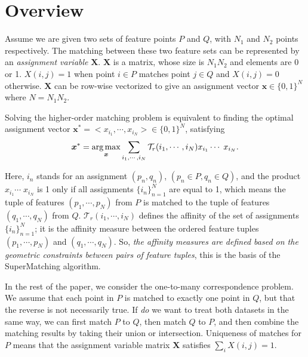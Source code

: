 \section{Overview}
\label{sec:overview}

Assume we are given two sets of feature points $P$ and $Q$, with $N_1$  and $N_2$ points respectively.
The matching between these two feature sets can be represented by an \emph{assignment variable} $\mathbf{X}$.
$\mathbf{X}$ is a matrix, whose size is $N_1N_2$ and elements are 0 or 1.
$X(i,j)=1$ when point $i \in P$ matches point $j \in Q$ and $X(i,j)=0$ otherwise.
$\mathbf{X}$ can be row-wise vectorized to give an assignment vector $\boldsymbol{x} \in \{0,1\}^N$ where $N={N_1N_2}$.

Solving the higher-order matching problem is equivalent to finding the optimal assignment vector ${\boldsymbol{x}}^*=<x_{i_1},\cdots,x_{i_N}>
 \in \{0,1\}^{N}$, satisfying
\begin{equation}
\label{equ:assigment}
  {\boldsymbol{x}}^* = \operatorname*{arg\,max}_{\boldsymbol{x}}  \sum_{i_1,\cdots,i_N} \mathcal{T}_r(i_1,\cdots,i_N) x_{i_1}  \cdots\; x_{i_N}.
\end{equation}

Here, $i_n$ stands for an assignment $(p_n,q_n)$, $(p_n\in P, q_n\in Q)$, and the
product $x_{i_1}  \cdots\;x_{i_N}$ is 1 only if all assignments $\{i_n\}_{n=1}^N$ are equal to 1,
which means the tuple of features $(p_1,\cdots,p_N)$ from $P$ is matched to the tuple of features $(q_1,\cdots,q_N)$ from $Q$.
$\mathcal{T}_r(i_1,\cdots,i_N)$ defines the affinity of the set of assignments $\{i_n\}_{n=1}^N$;
it is the affinity measure between the ordered feature tuples $(p_1,\cdots,p_N)$  and $(q_1,\cdots,q_N)$.
So, \emph{the affinity measures are defined based on the geometric constraints between pairs of feature tuples},
this is the basis of the SuperMatching algorithm.

In the rest of the paper, we consider the one-to-many correspondence problem.
We assume that each point in $P$ is matched to exactly one point in $Q$, but that the reverse is not necessarily true.
If \emph{do} we want to treat both datasets in the same way,
we can first match $P$ to $Q$, then match $Q$ to $P$, and then combine the matching results by taking their union or intersection.
Uniqueness of matches for $P$ means that the assignment variable matrix $\mathbf{X}$ satisfies $\sum\nolimits_i X(i,j)=1$.

